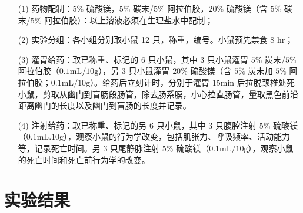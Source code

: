 \documentclass[UTF8]{ctexart}
\begin{document}
\begin{itemize}
    \item [(1)] 药物配制：$5\%$ 硫酸镁，$5\%$ 碳末/$5\%$ 阿拉伯胶，$20\%$ 硫酸镁（含 $5\%$ 碳末/$5\%$ 阿拉伯胶）：以上溶液必须在生理盐水中配制；
    \item [(2)] 实验分组：各小组分别取小鼠 12 只，称重，编号。小鼠预先禁食 8 hr；
    \item [(3)] 灌胃给药：取已称重、标记的 6 只小鼠，其中 3 只小鼠灌胃 $5\%$ 炭末/$5\%$ 阿拉伯胶（$0.1\text{mL}/10\text{g}$），另 3 只小鼠灌胃 $20\%$ 硫酸镁（含 $5\%$ 炭末加 $5\%$ 阿拉伯胶；$0.1\text{mL}/10\text{g}$）。给药后立刻计时，分别于灌胃 15min 后拉脱颈椎处死小鼠，剪取从幽门到盲肠段肠管，除去肠系膜，小心拉直肠管，量取黑色前沿距离幽门的长度以及幽门到盲肠的长度并记录。
    \item [(4)] 注射给药：取已称重、标记的另 6 只小鼠，其中 3 只腹腔注射 $5\%$ 硫酸镁（$0.1\text{mL}.10\text{g}$），观察小鼠的行为学改变，包括肌张力、呼吸频率、活动能力等，记录死亡时间。另 3 只尾静脉注射 $5\%$ 硫酸镁（$0.1\text{mL}/10\text{g}$），观察小鼠的死亡时间和死亡前行为学的改变。
\end{itemize}

\section{实验结果}
\end{document}
